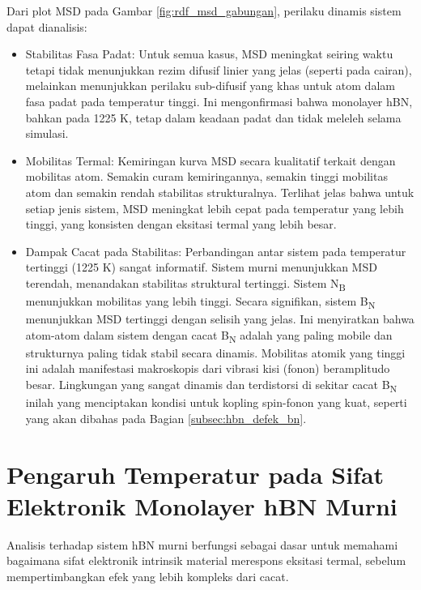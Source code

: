 Dari plot MSD pada Gambar \ref{fig:rdf_msd_gabungan}, perilaku dinamis sistem dapat dianalisis:
\begin{itemize}
    \item Stabilitas Fasa Padat: Untuk semua kasus, MSD meningkat seiring waktu tetapi tidak menunjukkan rezim difusif linier yang jelas (seperti pada cairan), melainkan menunjukkan perilaku sub-difusif yang khas untuk atom dalam fasa padat pada temperatur tinggi.
Ini mengonfirmasi bahwa monolayer hBN, bahkan pada 1225 K, tetap dalam keadaan padat dan tidak meleleh selama simulasi.
\item Mobilitas Termal: Kemiringan kurva MSD secara kualitatif terkait dengan mobilitas atom.
Semakin curam kemiringannya, semakin tinggi mobilitas atom dan semakin rendah stabilitas strukturalnya.
Terlihat jelas bahwa untuk setiap jenis sistem, MSD meningkat lebih cepat pada temperatur yang lebih tinggi, yang konsisten dengan eksitasi termal yang lebih besar.
\item Dampak Cacat pada Stabilitas: Perbandingan antar sistem pada temperatur tertinggi (1225 K) sangat informatif.
Sistem murni menunjukkan MSD terendah, menandakan stabilitas struktural tertinggi. Sistem N\textsubscript{B} menunjukkan mobilitas yang lebih tinggi.
Secara signifikan, sistem B\textsubscript{N} menunjukkan MSD tertinggi dengan selisih yang jelas.
Ini menyiratkan bahwa atom-atom dalam sistem dengan cacat B\textsubscript{N} adalah yang paling mobile dan strukturnya paling tidak stabil secara dinamis.
Mobilitas atomik yang tinggi ini adalah manifestasi makroskopis dari vibrasi kisi (fonon) beramplitudo besar.
Lingkungan yang sangat dinamis dan terdistorsi di sekitar cacat B\textsubscript{N} inilah yang menciptakan kondisi untuk kopling spin-fonon yang kuat, seperti yang akan dibahas pada Bagian \ref{subsec:hbn_defek_bn}.
\end{itemize}

\section{Pengaruh Temperatur pada Sifat Elektronik Monolayer hBN Murni}
\label{sec:hbn_murni}
Analisis terhadap sistem hBN murni berfungsi sebagai dasar untuk memahami bagaimana sifat elektronik intrinsik material merespons eksitasi termal, sebelum mempertimbangkan efek yang lebih kompleks dari cacat.
